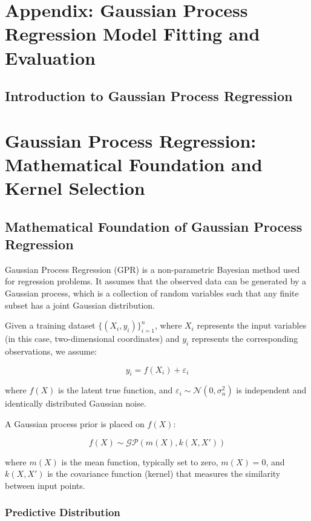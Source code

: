\documentclass[11pt]{article}
\begin{document}

\section*{Appendix: Gaussian Process Regression Model Fitting and Evaluation}

\subsection*{Introduction to Gaussian Process Regression}

\section{Gaussian Process Regression: Mathematical Foundation and Kernel Selection}

\subsection{Mathematical Foundation of Gaussian Process Regression}

Gaussian Process Regression (GPR) is a non-parametric Bayesian method used for regression problems. It assumes that the observed data can be generated by a Gaussian process, which is a collection of random variables such that any finite subset has a joint Gaussian distribution.

Given a training dataset $\{(X_i, y_i)\}_{i=1}^n$, where $X_i$ represents the input variables (in this case, two-dimensional coordinates) and $y_i$ represents the corresponding observations, we assume:

\[
y_i = f(X_i) + \varepsilon_i
\]

where $f(X)$ is the latent true function, and $\varepsilon_i \sim \mathcal{N}(0, \sigma_n^2)$ is independent and identically distributed Gaussian noise.

A Gaussian process prior is placed on $f(X)$:

\[
f(X) \sim \mathcal{GP}(m(X), k(X, X'))
\]

where $m(X)$ is the mean function, typically set to zero, $m(X) = 0$, and $k(X, X')$ is the covariance function (kernel) that measures the similarity between input points.

\subsubsection{Predictive Distribution}
\end{document}

